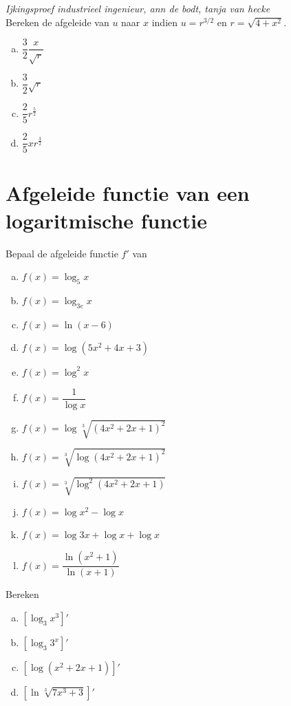 \documentclass[a4paper,12pt]{article}
\begin{document}
\begin{oefening}
{\em \scriptsize Ijkingsproef industrieel ingenieur, ann de bodt, tanja van hecke}\\
Bereken de afgeleide van $u$ naar $x$ indien $u=r^{3/2}$ en $r=\sqrt{4+x^2}$.
\begin{enumerate}[(a)]
  \itemsep.3em
  \item $\dfrac{3}{2}\dfrac{x}{\sqrt{r}}$
  \item $\dfrac{3}{2}\sqrt{r}$
  \item $\dfrac{2}{5}r^\frac{5}{2}$
  \item $\dfrac{2}{5}xr^\frac{3}{2}$
\end{enumerate}
\end{oefening}

\pagebreak
\section{Afgeleide functie van een logaritmische functie}

\begin{oefening}
Bepaal de afgeleide functie $f'$ van
\begin{multicols}{2}
\begin{enumerate}[(a)]
  \itemsep0.5em
  \item $\displaystyle f(x)=\log_5 x$
  \item $\displaystyle f(x)=\log_{3e} x$
  \item $\displaystyle f(x)=\ln(x-6)$
  \item $\displaystyle f(x)=\log(5x^2+4x+3)$
  \item $\displaystyle f(x)=\log^2 x$
  \item $\displaystyle f(x)=\dfrac{1}{\log x}$
  \item $\displaystyle f(x)=\log \sqrt[3]{\left(4x^2+2x+1\right)^2}$
  \item $\displaystyle f(x)=\sqrt[3]{\log\left(4x^2+2x+1\right)^2}$
  \item $\displaystyle f(x)=\sqrt[3]{\log^2(4x^2+2x+1)}$
  \item $\displaystyle f(x)=\log x^2 - \log x$
  \item $\displaystyle f(x)=\log 3x + \log x + \log x$
  \item $\displaystyle f(x)=\dfrac{\ln(x^2+1)}{\ln(x+1)}$
\end{enumerate}
\end{multicols}
\end{oefening}

\begin{oefening}
Bereken
\begin{enumerate}[(a)]
  \itemsep.7em
  \item $\displaystyle \left[\log_3 x^3\right]'$
  \item $\displaystyle \left[\log_3 3^x\right]'$
  \item $\displaystyle \left[\log \left(x^2+2x+1\right)\right]'$
  \item $\displaystyle \left[\ln \sqrt[3]{7x^3+3}\right]'$
\end{enumerate}
\end{oefening}
\end{document}
